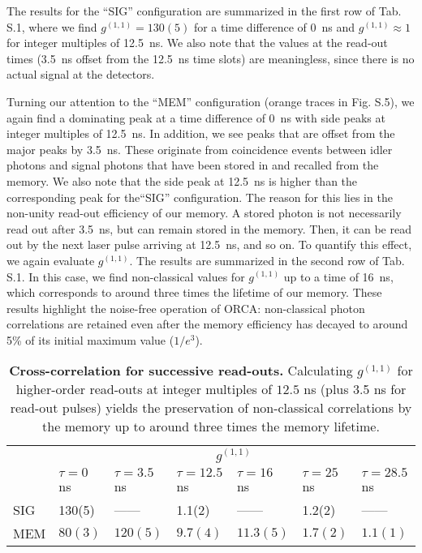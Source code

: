 \documentclass[%
 reprint,
 amsmath,amssymb,
 aps,
 pra,
]{revtex4-1}
\begin{document}
The results for the ``SIG'' configuration are summarized in the first row of Tab. S.1, where we find $g^{(1,1)}=130(5)$ for a time difference of 0~ns and $g^{(1,1)}\approx1$ for integer multiples of 12.5~ns. We also note that the values at the read-out times (3.5~ns offset from the 12.5~ns time slots) are meaningless, since there is no actual signal at the detectors. 

Turning our attention to the ``MEM'' configuration (orange traces in Fig. S.5), we again find a dominating peak at a time difference of 0~ns with side peaks at integer multiples of 12.5~ns. In addition, we see peaks that are offset from the major peaks by 3.5~ns. These originate from coincidence events between idler photons and signal photons that have been stored in and recalled from the memory. We also note that the side peak at 12.5~ns is higher than the corresponding peak for the``SIG'' configuration. The reason for this lies in the non-unity read-out efficiency of our memory. A stored photon is not necessarily read out after 3.5~ns, but can remain stored in the memory. Then, it can be read out by the next laser pulse arriving at 12.5~ns, and so on. To quantify this effect, we again evaluate $g^{(1,1)}$. The results are summarized in the second row of Tab. S.1. In this case, we find non-classical values for $g^{(1,1)}$ up to a time of 16~ns, which corresponds to around three times the lifetime of our memory. These results highlight the noise-free operation of ORCA: non-classical photon correlations are retained even after the memory efficiency has decayed to around 5\% of its initial maximum value ($1/e^3$).

\begin{table}
\centering
\begin{tabular}{|l||l|l|l|l|l|l|}
\hline
\multirow{2}{*}{}   & \multicolumn{6}{c|}{$g^{(1,1)}$} \\
    & $\tau=0$ ns & $\tau=3.5$ ns & $\tau=12.5$ ns & $\tau=16$ ns & $\tau=25$ ns & $\tau=28.5$ ns \\
\hline\hline
SIG & 130(5) & ------ & 1.1(2) & ------ & 1.2(2) & ------ \\
\hline
MEM & $80(3)$ & $120(5)$ & $9.7(4)$ & $11.3(5)$ & $1.7(2)$ & $1.1(1)$ \\
\hline
\end{tabular}
\caption{\textbf{Cross-correlation for successive read-outs.} Calculating $g^{(1,1)}$ for higher-order read-outs at integer multiples of $12.5$ ns (plus 3.5 ns for read-out pulses) yields the preservation of non-classical correlations by the memory up to around three times the memory lifetime.}\label{tab:g11}
\end{table}
\end{document}
